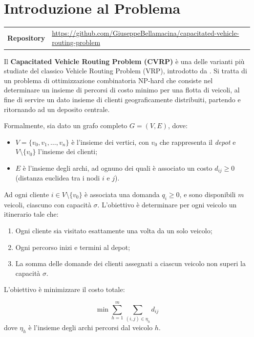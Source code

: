 \chapter{Introduzione al Problema}

\noindent
\begin{tabular}{@{}l@{\quad}l@{}}
  \textbf{Repository} & \url{https://github.com/GiuseppeBellamacina/capacitated-vehicle-routing-problem} \\
\end{tabular}
\bigskip

Il \textbf{Capacitated Vehicle Routing Problem (CVRP)} \`e una delle varianti pi\`u studiate
del classico Vehicle Routing Problem (VRP), introdotto da \cite{dantzig1959truck}.
Si tratta di un problema di ottimizzazione
combinatoria NP-hard \cite{toth2002vehicle} che consiste nel determinare un insieme di percorsi di costo minimo
per una flotta di veicoli, al fine di servire un dato insieme di clienti geograficamente
distribuiti, partendo e ritornando ad un deposito centrale.

Formalmente, sia dato un grafo completo $G = (V, E)$, dove:
\begin{itemize}
    \item $V = \{v_0, v_1, \dots, v_n\}$ \`e l'insieme dei vertici, con $v_0$ che
          rappresenta il \textit{depot} e $V \setminus \{v_0\}$ l'insieme dei clienti;
    \item $E$ \`e l'insieme degli archi, ad ognuno dei quali \`e associato un costo
          $d_{ij} \geq 0$ (distanza euclidea tra i nodi $i$ e $j$).
\end{itemize}

Ad ogni cliente $i \in V \setminus \{v_0\}$ \`e associata una domanda $q_i \geq 0$,
e sono disponibili $m$ veicoli, ciascuno con capacit\`a $\sigma$.
L'obiettivo \`e determinare per ogni veicolo un itinerario tale che:
\begin{enumerate}[label=(\roman*)]
    \item Ogni cliente sia visitato esattamente una volta da un solo veicolo;
    \item Ogni percorso inizi e termini al depot;
    \item La somma delle domande dei clienti assegnati a ciascun veicolo non superi
          la capacit\`a $\sigma$.
\end{enumerate}

L'obiettivo \`e minimizzare il costo totale:

\begin{equation}
    \min \sum_{h=1}^{m} \sum_{(i,j) \in \eta_h} d_{ij}
\end{equation}
dove $\eta_h$ \`e l'insieme degli archi percorsi dal veicolo $h$.

